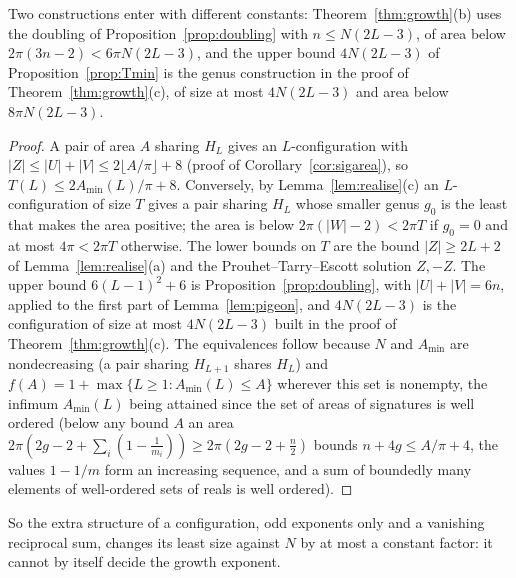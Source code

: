 \documentclass[pdflatex,sn-mathphys-num]{sn-jnl}
\theoremstyle{thmstyleone}%
\theoremstyle{thmstylethree}%
\begin{document}
Two constructions enter with different constants: Theorem~\ref{thm:growth}(b) uses the doubling of Proposition~\ref{prop:doubling} with $n\le N(2L-3)$, of area below $2\pi(3n-2)<6\pi N(2L-3)$, and the upper bound $4N(2L-3)$ of Proposition~\ref{prop:Tmin} is the genus construction in the proof of Theorem~\ref{thm:growth}(c), of size at most $4N(2L-3)$ and area below $8\pi N(2L-3)$.

\begin{proof}
A pair of area $A$ sharing $H_L$ gives an $L$-configuration with $|Z|\le|U|+|V|\le2\lfloor A/\pi\rfloor+8$ (proof of Corollary~\ref{cor:sigarea}), so $T(L)\le2A_{\min}(L)/\pi+8$. Conversely, by Lemma~\ref{lem:realise}(c) an $L$-configuration of size $T$ gives a pair sharing $H_L$ whose smaller genus $g_0$ is the least that makes the area positive; the area is below $2\pi(|W|-2)<2\pi T$ if $g_0=0$ and at most $4\pi<2\pi T$ otherwise. The lower bounds on $T$ are the bound $|Z|\ge2L+2$ of Lemma~\ref{lem:realise}(a) and the Prouhet--Tarry--Escott solution $Z,-Z$. The upper bound $6(L-1)^2+6$ is Proposition~\ref{prop:doubling}, with $|U|+|V|=6n$, applied to the first part of Lemma~\ref{lem:pigeon}, and $4N(2L-3)$ is the configuration of size at most $4N(2L-3)$ built in the proof of Theorem~\ref{thm:growth}(c). The equivalences follow because $N$ and $A_{\min}$ are nondecreasing (a pair sharing $H_{L+1}$ shares $H_L$) and $f(A)=1+\max\{L\ge1:A_{\min}(L)\le A\}$ wherever this set is nonempty, the infimum $A_{\min}(L)$ being attained since the set of areas of signatures is well ordered (below any bound $A$ an area $2\pi(2g-2+\sum_i(1-\frac1{m_i}))\ge2\pi(2g-2+\frac n2)$ bounds $n+4g\le A/\pi+4$, the values $1-1/m$ form an increasing sequence, and a sum of boundedly many elements of well-ordered sets of reals is well ordered). \end{proof}

So the extra structure of a configuration, odd exponents only and a vanishing reciprocal sum, changes its least size against $N$ by at most a constant factor: it cannot by itself decide the growth exponent.
\end{document}
